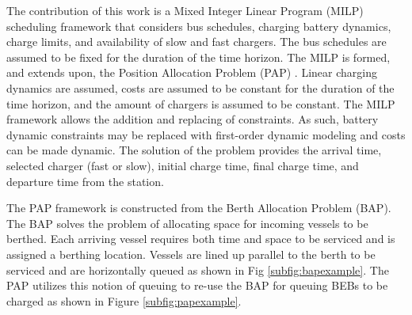 \documentclass[letterpaper, 10pt, conference]{IEEEtran}
\begin{document}
The contribution of this work is a Mixed Integer Linear Program (MILP) scheduling framework that considers bus schedules, charging battery dynamics, charge limits, and availability of slow and fast chargers. The bus schedules are assumed to be fixed for the duration of the time horizon. The MILP is formed, and extends upon, the Position Allocation Problem (PAP) \cite{Qarebagh2019}. Linear charging dynamics are assumed, costs are assumed to be constant for the duration of the time horizon, and the amount of chargers is assumed to be constant. The MILP framework allows the addition and replacing of constraints. As such, battery dynamic constraints may be replaced with first-order dynamic modeling and costs can be made dynamic. The solution of the problem provides the arrival time, selected charger (fast or slow), initial charge time, final charge time, and departure time from the station.

The PAP framework is constructed from the Berth Allocation Problem (BAP). The BAP solves the problem of allocating space for incoming vessels to be berthed. Each arriving vessel requires both time and space to be serviced and is assigned a berthing location. Vessels are lined up parallel to the berth to be serviced and are horizontally queued as shown in Fig \ref{subfig:bapexample}. The PAP utilizes this notion of queuing to re-use the BAP for queuing BEBs to be charged as shown in Figure \ref{subfig:papexample}.
\end{document}
